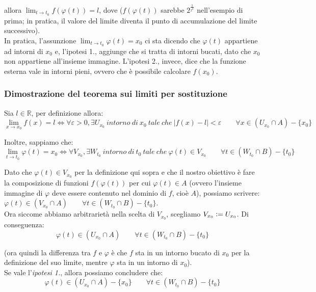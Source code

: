 \documentclass{article}
\begin{document}
\noindent allora $\lim_{t \to t_0} f(\varphi(t)) = l$, dove ($f(\varphi(t))$ sarebbe $2^\frac{1}{t^2}$ nell'esempio di prima; in pratica, il valore del limite diventa il punto di accumulazione del limite successivo). \\
In pratica, l'assunzione $\lim_{t \to t_0} \varphi(t) = x_0$ ci sta dicendo che $\varphi(t)$ appartiene ad intorni di $x_0$ e, l'ipotesi 1., aggiunge che si tratta di intorni bucati, dato che $x_0$ non appartiene all'insieme immagine. L'ipotesi 2., invece, dice che la funzione esterna vale in intorni pieni, ovvero che è possibile calcolare $f(x_0)$.

\subsubsection{Dimostrazione del teorema sui limiti per sostituzione}
Sia $l \in \mathbb{R}$, per definizione allora:
\begin{equation*}
    \lim_{x \to x_0} f(x) = l \iff \forall \varepsilon > 0, \exists U_{x_0} \ intorno \ di \ x_0 \ tale \ che \ |f(x) - l| < \varepsilon \qquad \forall x \in (U_{x_0} \cap A) - \{x_0\}
\end{equation*}

\noindent Inoltre, sappiamo che:
\begin{equation*}
    \lim_{t \to t_0} \varphi(t) = x_0 \iff \forall V_{x_0}, \exists W_{t_0} \ intorno \ di \ t_0 \ tale \ che \ \varphi(t) \in V_{x_0} \qquad \forall t \in (W_{t_0} \cap B) - \{t_0\}
\end{equation*}

\noindent Dato che $\varphi(t) \in V_{x_0}$ per la definizione qui sopra e che il nostro obiettivo è fare la composizione di funzioni $f(\varphi(t))$ per cui $\varphi(t) \in A$ (ovvero l'insieme immagine di $\varphi$ deve essere contenuto nel dominio di $f$, cioè $A$), possiamo scrivere: $\varphi(t) \in (V_{x_0} \cap A) \qquad \forall t \in (W_{t_0} \cap B) - \{t_0\}$.\\
Ora siccome abbiamo arbitrarietà nella scelta di $V_{x_0}$, scegliamo $V_{x_0} \vcentcolon = U_{x_0}$. Di conseguenza:
\begin{equation*}
    \varphi(t) \in (U_{x_0} \cap A) \qquad \forall t \in (W_{t_0} \cap B) - \{t_0\}
\end{equation*}

\noindent (ora quindi la differenza tra $f$ e $\varphi$ è che $f$ sta in un intorno bucato di $x_0$ per la definizione del suo limite, mentre $\varphi$ sta in un intorno di $x_0$).\\
Se vale l'\textit{ipotesi 1.}, allora possiamo concludere che:
\begin{equation*}
    \varphi(t) \in (U_{x_0} \cap A) - \{x_0\} \qquad \forall t \in (W_{t_0} \cap B) - \{t_0\}
\end{equation*}
\end{document}

